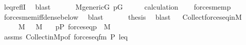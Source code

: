 \begin{isabellebody}
\ leq{\isacharunderscore}{\kern0pt}reflI\ \isamarkupfalse%
\ blast\isanewline
\ \ \isamarkupfalse%
\isanewline
\ \ \isamarkupfalse%
\ {\isacartoucheopen}M{\isacharunderscore}{\kern0pt}generic{\isacharparenleft}{\kern0pt}G{\isacharparenright}{\kern0pt}{\isacartoucheclose}\ {\isacartoucheopen}p{\isasymin}G{\isacartoucheclose}\isanewline
\ \ \isamarkupfalse%
\ \isamarkupfalse%
\ calculation\isanewline
\ \ \isamarkupfalse%
\ {\isachardoublequoteopen}forces{\isacharunderscore}{\kern0pt}mem{\isacharparenleft}{\kern0pt}p{\isacharcomma}{\kern0pt}{\isasympi}{\isacharcomma}{\kern0pt}{\isasymtau}{\isacharparenright}{\kern0pt}{\isachardoublequoteclose}\ \isanewline
\ \ \ \ \isamarkupfalse%
\ forces{\isacharunderscore}{\kern0pt}mem{\isacharunderscore}{\kern0pt}iff{\isacharunderscore}{\kern0pt}dense{\isacharunderscore}{\kern0pt}below\ \isamarkupfalse%
\ blast\isanewline
\ \ \isamarkupfalse%
\isanewline
\ \ \isamarkupfalse%
\ {\isacharquery}{\kern0pt}thesis\ \isamarkupfalse%
\ blast\isanewline
{}\isamarkupfalse%
%
\endisatagproof
{\isafoldproof}%
%
\isadelimproof
\isanewline
%
\endisadelimproof
\isanewline
{}\isamarkupfalse%
\ \isanewline
\isanewline
{}\isamarkupfalse%
\ Collect{\isacharunderscore}{\kern0pt}forces{\isacharunderscore}{\kern0pt}eq{\isacharunderscore}{\kern0pt}in{\isacharunderscore}{\kern0pt}M{\isacharcolon}{\kern0pt}\isanewline
\ \ \ {\isachardoublequoteopen}{\isasymtau}\ {\isasymin}\ M{\isachardoublequoteclose}\ {\isachardoublequoteopen}{\isasymtheta}\ {\isasymin}\ M{\isachardoublequoteclose}\isanewline
\ \ \ {\isachardoublequoteopen}{\isacharbraceleft}{\kern0pt}p{\isasymin}P{\isachardot}{\kern0pt}\ forces{\isacharunderscore}{\kern0pt}eq{\isacharparenleft}{\kern0pt}p{\isacharcomma}{\kern0pt}{\isasymtau}{\isacharcomma}{\kern0pt}{\isasymtheta}{\isacharparenright}{\kern0pt}{\isacharbraceright}{\kern0pt}\ {\isasymin}\ M{\isachardoublequoteclose}\isanewline
%
\isadelimproof
\ \ %
\endisadelimproof
%
\isatagproof
{}\isamarkupfalse%
\ assms\ Collect{\isacharunderscore}{\kern0pt}in{\isacharunderscore}{\kern0pt}M{\isacharunderscore}{\kern0pt}{}p{\isacharbrackleft}{\kern0pt}of\ {\isachardoublequoteopen}forces{\isacharunderscore}{\kern0pt}eq{\isacharunderscore}{\kern0pt}fm{\isacharparenleft}{\kern0pt}{}{\isacharcomma}{\kern0pt}{}{\isacharcomma}{\kern0pt}{}{\isacharcomma}{\kern0pt}{}{\isacharcomma}{\kern0pt}{}{\isacharparenright}{\kern0pt}{\isachardoublequoteclose}\ P\ leq\ {\isasymtau}\ {\isasymtheta}\ \isanewline

\end{isabellebody}
